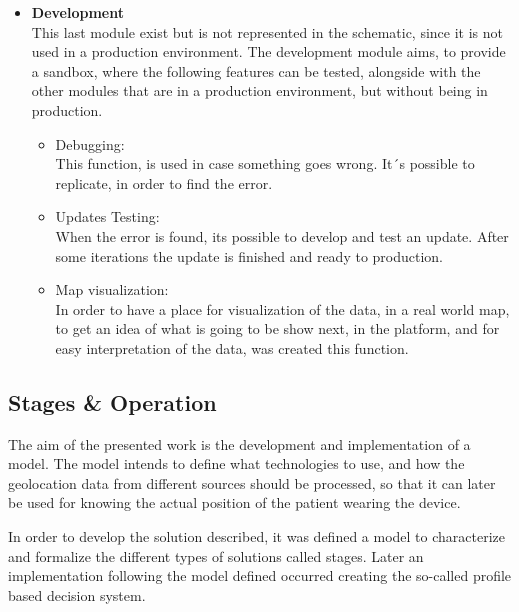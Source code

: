 \begin{itemize}
   \item \textbf{Development}\\
   This last module exist but is not represented in the schematic, since it is not used in a production environment. The development module aims, to provide a sandbox, where the following features can be tested, alongside with the other modules that are in a production environment, but without being in production.
   \begin{itemize}
     \item Debugging:  \\This  function, is used in case something goes wrong. It´s possible to replicate, in order to find the error.
   \end{itemize}
   \begin{itemize}
     \item Updates Testing: \\When the error is found, its possible to develop and test an update. After some iterations the update is finished and ready to production. 
   \end{itemize}
   \begin{itemize}
     \item Map visualization: \\ In order to have a place for visualization of the data, in a real world map, to get an idea of what is going to be show next, in the platform, and for easy interpretation of the data, was created this function.
   \end{itemize}
\end{itemize}









\newpage
\subsection{Stages \& Operation}
\label{susec:Stages_Operation}

The aim of the presented work is the development and implementation of a model. The model intends to define what technologies to use, and how the geolocation data from different sources should be processed, so that it can later be used for knowing the actual position of the patient wearing the device.

In order to develop the solution described, it was defined a model to characterize and formalize the different types of solutions called stages. Later an implementation following the model defined occurred creating the so-called profile based decision system.


